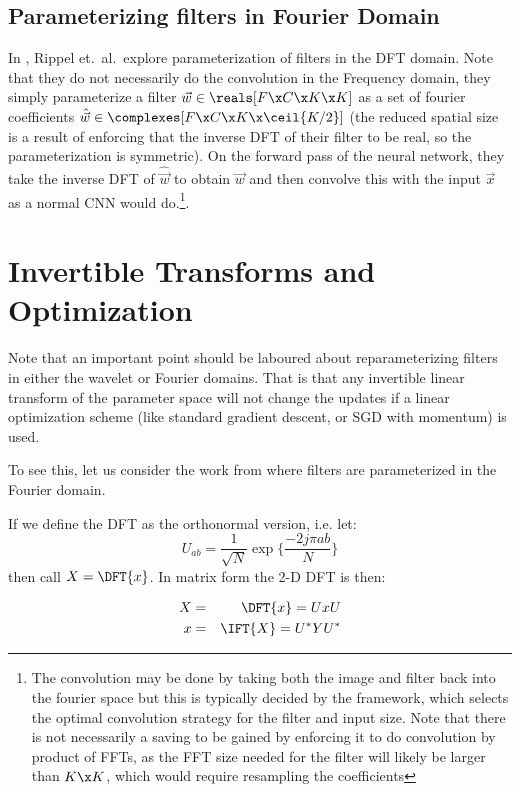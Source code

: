 \subsection{Parameterizing filters in Fourier Domain}
In  \cite{rippel_spectral_2015}, Rippel et.\
al.\ explore parameterization of filters in the DFT domain.  Note that they do
not necessarily do the convolution in the Frequency
domain, they simply parameterize a filter $\vec{w} \in \reals[F\x C\x K\x K]$ as
a set of fourier coefficients $\hat{\vec{w}} \in \complexes[F\x C\x K \x \ceil{K/2}]$
(the reduced spatial size is a result of enforcing that the inverse DFT of their
filter to be real, so the parameterization is symmetric). On the forward pass of
the neural network, they take the inverse DFT of $\hat{\vec{w}}$ to obtain
$\vec{w}$ and then convolve this with the input $\vec{x}$ as a normal CNN
would do.\footnote{The convolution may be done by taking both the image and
filter back into the fourier space but this is typically decided by the
framework, which selects the optimal convolution strategy for the filter and
input size. Note that there is not necessarily a saving to be gained by
enforcing it to do convolution by product of FFTs, as the FFT size needed for
the filter will likely be larger than $K\x K$, which would require resampling
the coefficients}. 

\section{Invertible Transforms and Optimization}
Note that an important point should be laboured about reparameterizing filters
in either the wavelet or Fourier domains. That is that any invertible linear
transform of the parameter space will not change the updates if a linear
optimization scheme (like standard gradient descent, or SGD with momentum) is
used.

To see this, let us consider the work from \cite{rippel_spectral_2015} where
filters are parameterized in the Fourier domain. 

If we define the DFT as the orthonormal version, i.e. let:
$$ U_{ab} = \frac{1}{\sqrt{N}} \exp\{ \frac{-2j\pi ab}{N} \} $$
%
then call $X = \DFT{x}$. In matrix form the 2-D DFT is then:

\begin{eqnarray}
  X &=& \DFT{x} = UxU \\
  x &=& \IFT{X} = U^*YU^* 
\end{eqnarray}

